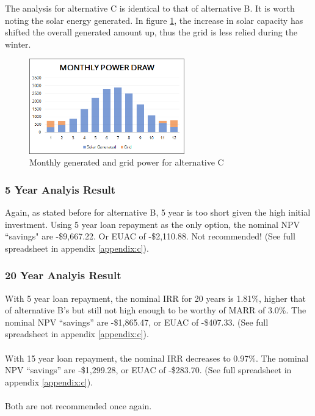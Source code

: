 \documentclass[10pt,letterpaper]{article}
\begin{document}
The analysis for alternative C is identical to that of alternative B. It is worth noting the solar energy generated. In figure \ref{fig:c-generation}, the increase in solar capacity has shifted the overall generated amount up, thus the grid is less relied during the winter.\\

\begin{figure}[H]
	\centering
	\includegraphics[width=0.6\textwidth]{assets/1534568620011}
	\caption{Monthly generated and grid power for alternative C}
	\label{fig:c-generation}
\end{figure}

\subsubsection{5 Year Analyis Result}

Again, as stated before for alternative B, 5 year is too short given the high initial investment. Using 5 year loan repayment as the only option, the nominal NPV ``savings" are -\$9,667.22. Or EUAC of -\$2,110.88. Not recommended! (See full spreadsheet in appendix \ref{appendix:c}).\\

\subsubsection{20 Year Analyis Result}

With 5 year loan repayment, the nominal IRR for 20 years is 1.81\%, higher that of alternative B's but still not high enough to be worthy of MARR of 3.0\%. The nominal NPV ``savings'' are -\$1,865.47, or EUAC of -\$407.33. (See full spreadsheet in appendix \ref{appendix:c}).\\
\\
With 15 year loan repayment, the nominal IRR decreases to 0.97\%. The nominal NPV ``savings'' are -\$1,299.28, or EUAC of -\$283.70. (See full spreadsheet in appendix \ref{appendix:c}).\\
\\
Both are not recommended once again.\\
\end{document}
